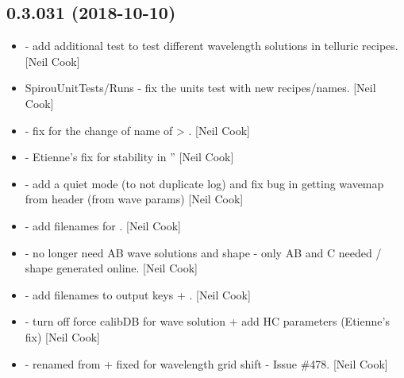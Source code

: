 \documentclass[a4paper,10pt,english]{report}
\begin{document}
\subsection{0.3.031 (2018-10-10)}
\label{\detokenize{misc/changelog:id299}}\begin{itemize}
\item {} 
 - add additional test to test different wavelength
solutions in telluric recipes. {[}Neil Cook{]}

\item {} 
SpirouUnitTests/Runs - fix the units test with new recipes/names.
{[}Neil Cook{]}

\item {} 
 - fix for the change of name of
 \textendash{}\textgreater{} . {[}Neil Cook{]}

\item {} 
 - Etienne’s fix for  stability in
” {[}Neil Cook{]}

\item {} 
 - add a quiet mode (to not duplicate log) and fix bug in
getting wavemap from header (from wave params) {[}Neil Cook{]}

\item {} 
 - add filenames for . {[}Neil Cook{]}

\item {} 
 - no longer need AB wave solutions and shape
- only AB and C needed / shape generated online. {[}Neil Cook{]}

\item {} 
 - add  filenames to output keys +
. {[}Neil Cook{]}

\item {} 
 - turn off force calibDB for wave solution +
add HC parameters (Etienne’s fix) {[}Neil Cook{]}

\item {} 
 - renamed from  + fixed for
wavelength grid shift - Issue \#478. {[}Neil Cook{]}


\end{itemize}
\end{document}
